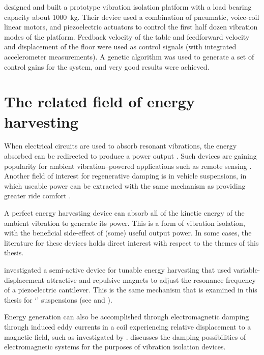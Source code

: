 \textcite{yoshioka2001} designed and built a prototype vibration isolation
platform with a load bearing capacity about \SI{1000}{kg}. Their device used a
combination of pneumatic, voice-coil linear motors, and piezoelectric
actuators to control the first half dozen vibration modes of the platform.
Feedback velocity of the table and feedforward velocity and displacement of
the floor were used as control signals (with integrated accelerometer
measurements). A genetic algorithm was used to generate a set of control gains
for the system, and very good results were achieved.



\section{The related field of energy harvesting}

When electrical circuits are used to absorb resonant vibrations, the energy
absorbed can be redirected to produce a power output \cite{stephen2006}. Such
devices are gaining popularity for ambient vibration--powered applications
such as remote sensing \cite{arnold2007}. Another field of interest for
regenerative damping is in vehicle suspensions, in which useable power can be
extracted with the same mechanism as providing greater ride comfort
\cite{graves2000thesis}.

A perfect energy harvesting device can absorb all of the kinetic energy of the
ambient vibration to generate its power. This is a form of vibration
isolation, with the beneficial side-effect of (some) useful output power. In
some cases, the literature for these devices holds direct interest with
respect to the themes of this thesis.

\textcite{challa2008} investigated a semi-active device for tunable energy
harvesting that used variable-displacement attractive and repulsive magnets to
adjust the resonance frequency of a piezoelectric cantilever. This is the same
mechanism that is examined in this thesis for `\qzs' suspensions (see
 and ).

Energy generation can also be accomplished through electromagnetic damping
through induced eddy currents in a coil experiencing relative displacement to
a magnetic field, such as investigated by \textcite{graves2000}.
 discusses the damping possibilities of electromagnetic
systems for the purposes of vibration isolation devices.

